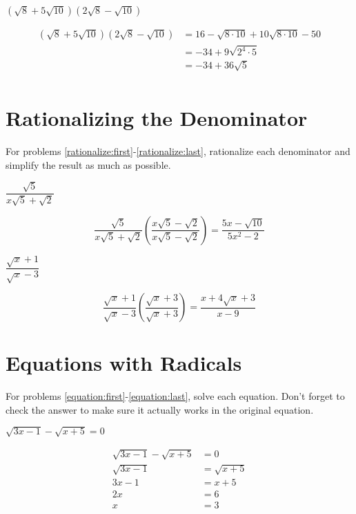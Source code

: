 \documentclass[fleqn,addpoints]{exam}
\begin{document}
\begin{questions}
\begin{solution}[5 cm]
\end{solution}

\question[7] \( (\sqrt{8} + 5 \sqrt{10})(2\sqrt{8} - \sqrt{10}) \)
\label{multiply:last}
\begin{solution}[5 cm]
\begin{align*}
  (\sqrt{8} + 5 \sqrt{10})(2\sqrt{8} - \sqrt{10}) &= 16 - \sqrt{8 \cdot 10} + 10 \sqrt{8 \cdot 10} - 50 \\
  &= -34 + 9 \sqrt{2^4 \cdot 5} \\
  &= -34 + 36 \sqrt{5} \\
\end{align*}
\end{solution}


\section{Rationalizing the Denominator}

For problems \ref{rationalize:first}-\ref{rationalize:last}, rationalize each denominator and simplify the result as
much as possible.

\question[5] \( \dfrac{\sqrt{5}}{x \sqrt{5} + \sqrt{2}} \)
\label{rationalize:first}
\begin{solution}[3 cm]
\[
  \frac{\sqrt{5}}{x \sqrt{5} + \sqrt{2}} \left( \frac{x \sqrt{5} - \sqrt{2}}{x \sqrt{5} - \sqrt{2}} \right)
  = \frac{5x-\sqrt{10}}{5x^2-2}
\]
\end{solution}

\question[5] \( \dfrac{\sqrt{x} + 1}{\sqrt{x} - 3} \)
\label{rationalize:last}
\begin{solution}[3 cm]
\[
  \frac{\sqrt{x} + 1}{\sqrt{x} - 3} \left( \frac{\sqrt{x} + 3}{\sqrt{x} + 3} \right)
  = \frac{x + 4\sqrt{x} + 3}{x-9}
\]
\end{solution}

\section{Equations with Radicals}

For problems \ref{equation:first}-\ref{equation:last}, solve each equation.  Don't forget to check the answer to make
sure it actually works in the original equation.

\question[5] \( \sqrt{3x-1}  - \sqrt{x+5} = 0\)
\label{equation:first}
\begin{solution}[5 cm]
\begin{align*}
  \sqrt{3x-1}  - \sqrt{x+5} &= 0 \\
  \sqrt{3x-1} &= \sqrt{x+5} \\
  3x-1 &= x+5 \\
  2x &= 6 \\
  x &= 3 \\
\end{align*}


\end{solution}
\end{questions}
\end{document}
